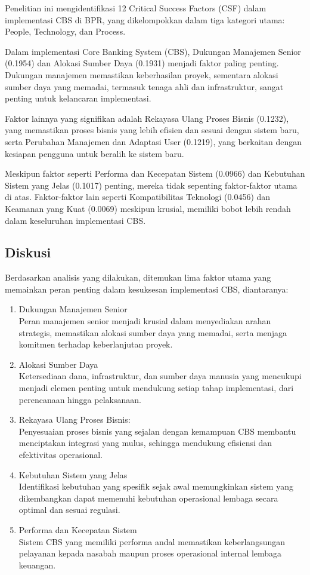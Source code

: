 \documentclass[journal,article,submit,pdftex,moreauthors]{Definitions/mdpi}
\begin{document}
Penelitian ini mengidentifikasi 12 Critical Success Factors (CSF) dalam implementasi CBS di BPR, yang dikelompokkan dalam tiga kategori utama: People, Technology, dan Process. 

Dalam implementasi Core Banking System (CBS), Dukungan Manajemen Senior (0.1954) dan Alokasi Sumber Daya (0.1931) menjadi faktor paling penting. Dukungan manajemen memastikan keberhasilan proyek, sementara alokasi sumber daya yang memadai, termasuk tenaga ahli dan infrastruktur, sangat penting untuk kelancaran implementasi.

Faktor lainnya yang signifikan adalah Rekayasa Ulang Proses Bisnis (0.1232), yang memastikan proses bisnis yang lebih efisien dan sesuai dengan sistem baru, serta Perubahan Manajemen dan Adaptasi User (0.1219), yang berkaitan dengan kesiapan pengguna untuk beralih ke sistem baru.

Meskipun faktor seperti Performa dan Kecepatan Sistem (0.0966) dan Kebutuhan Sistem yang Jelas (0.1017) penting, mereka tidak sepenting faktor-faktor utama di atas. Faktor-faktor lain seperti Kompatibilitas Teknologi (0.0456) dan Keamanan yang Kuat (0.0069) meskipun krusial, memiliki bobot lebih rendah dalam keseluruhan implementasi CBS.

\subsection{Diskusi}
Berdasarkan analisis yang dilakukan, ditemukan lima faktor utama yang memainkan peran penting dalam kesuksesan implementasi CBS, diantaranya:

\begin{enumerate}
   \item Dukungan Manajemen Senior
 \\  Peran manajemen senior menjadi krusial dalam menyediakan arahan strategis, memastikan alokasi sumber daya yang memadai, serta menjaga komitmen terhadap keberlanjutan proyek.

 \item Alokasi Sumber Daya
\\ Ketersediaan dana, infrastruktur, dan sumber daya manusia yang mencukupi menjadi elemen penting untuk mendukung setiap tahap implementasi, dari perencanaan hingga pelaksanaan.

  \item Rekayasa Ulang Proses Bisnis: 
 \\ Penyesuaian proses bisnis yang sejalan dengan kemampuan CBS membantu menciptakan integrasi yang mulus, sehingga mendukung efisiensi dan efektivitas operasional.

 \item Kebutuhan Sistem yang Jelas
\\ Identifikasi kebutuhan yang spesifik sejak awal memungkinkan sistem yang dikembangkan dapat memenuhi kebutuhan operasional lembaga secara optimal dan sesuai regulasi.

 \item Performa dan Kecepatan Sistem
  \\  Sistem CBS yang memiliki performa andal memastikan keberlangsungan pelayanan kepada nasabah maupun proses operasional internal lembaga keuangan.
\end{enumerate}
\end{document}
